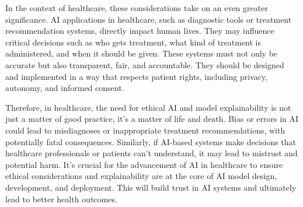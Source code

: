 In the context of healthcare, these considerations take on an even greater significance. AI applications in healthcare, such as diagnostic tools or treatment recommendation systems, directly impact human lives. They may influence critical decisions such as who gets treatment, what kind of treatment is administered, and when it should be given. These systems must not only be accurate but also transparent, fair, and accountable. They should be designed and implemented in a way that respects patient rights, including privacy, autonomy, and informed consent.

Therefore, in healthcare, the need for ethical AI and model explainability is not just a matter of good practice, it's a matter of life and death. Bias or errors in AI could lead to misdiagnoses or inappropriate treatment recommendations, with potentially fatal consequences. Similarly, if AI-based systems make decisions that healthcare professionals or patients can't understand, it may lead to mistrust and potential harm. It's crucial for the advancement of AI in healthcare to ensure ethical considerations and explainability are at the core of AI model design, development, and deployment. This will build trust in AI systems and ultimately lead to better health outcomes.